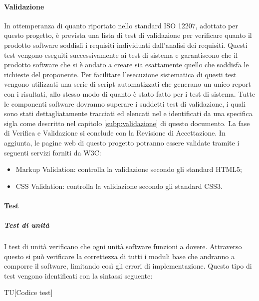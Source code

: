 			\paragraph{Validazione}
			In ottemperanza di quanto riportato nello standard ISO 12207, adottato per questo progetto, è prevista una lista di test di validazione per verificare quanto il prodotto software soddisfi i requisiti individuati dall'analisi dei requisiti. Questi test vengono eseguiti successivamente ai test di sistema e garantiscono che il prodotto software che si è andato a creare sia esattamente quello che soddisfa le richieste del proponente. 
			\newline
			Per facilitare l'esecuzione sistematica di questi test vengono utilizzati una serie di script automatizzati che generano un unico report con i risultati, allo stesso modo di quanto è stato fatto per i test di sistema.
			\newline
			Tutte le componenti software dovranno superare i suddetti test di validazione, i quali sono stati dettagliatamente tracciati ed elencati nel  \docNameVersionPdQ e identificati da una specifica sigla come descritto nel capitolo \ref{subp:validazione} di questo documento.	
			\newline
			La fase di Verifica e Validazione si conclude con la Revisione di Accettazione.
			\newline
			In aggiunta, le pagine web di questo progetto potranno essere validate tramite i seguenti servizi forniti da W3C:
			\begin{itemize}
				\item Markup Validation: controlla la validazione secondo gli standard HTML5;
				\item CSS Validation: controlla la validazione secondo gli standard CSS3.
			\end{itemize}			

			\paragraph{Test} %
			\label{par:test}
				\subparagraph{Test di unità}
				I test di unità verificano che ogni unità software funzioni a dovere. Attraverso questo si può verificare la correttezza di tutti i moduli base che andranno a comporre il software, limitando così gli errori di implementazione. Questo tipo di test vengono identificati con la sintassi seguente:\\
				 \begin{center}
				 	TU[Codice test]
				 \end{center}

